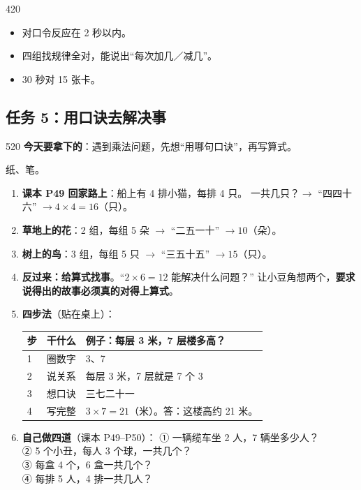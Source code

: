 \begin{lesson}{4}{20}
\begin{passbox}
\begin{itemize}
  \item 对口令反应在 2 秒以内。
  \item 四组找规律全对，能说出“每次加几／减几”。
  \item 30 秒对 15 张卡。
\end{itemize}
\end{passbox}
\end{lesson}

\subsection{任务 5：用口诀去解决事}

\begin{lesson}{5}{20}
\textbf{今天要拿下的}：遇到乘法问题，先想“用哪句口诀”，再写算式。

\begin{materials}
纸、笔。
\end{materials}

\begin{enumerate}
  \item \textbf{课本 P49 回家路上}：船上有 4 排小猫，每排 4 只。
        一共几只？$\to$ “四四十六” $\to 4\times4=16$（只）。
  \item \textbf{草地上的花}：2 组，每组 5 朵 $\to$ “二五一十” $\to 10$（朵）。
  \item \textbf{树上的鸟}：3 组，每组 5 只 $\to$ “三五十五” $\to 15$（只）。
  \item \textbf{反过来：给算式找事}。“$2\times6=12$ 能解决什么问题？”
        让小豆角想两个，\textbf{要求说得出的故事必须真的对得上算式}。
  \item \textbf{四步法}（贴在桌上）：
        \begin{center}
        \small
        \begin{tabularx}{\linewidth}{@{}p{1.0cm}p{1.8cm}X@{}}
        \toprule
        \textbf{步} & \textbf{干什么} & \textbf{例子：每层 3 米，7 层楼多高？} \\
        \midrule
        1 & 圈数字 & 3、7 \\
        2 & 说关系 & 每层 3 米，7 层就是 7 个 3 \\
        3 & 想口诀 & 三七二十一 \\
        4 & 写完整 & $3\times7=21$（米）。答：这楼高约 21 米。 \\
        \bottomrule
        \end{tabularx}
        \end{center}
  \item \textbf{自己做四道}（课本 P49--P50）：
        ① 一辆缆车坐 2 人，7 辆坐多少人？\\
        ② 5 个小丑，每人 3 个球，一共几个？\\
        ③ 每盒 4 个，6 盒一共几个？\\
        ④ 每排 5 人，4 排一共几人？
\end{enumerate}


\end{lesson}
